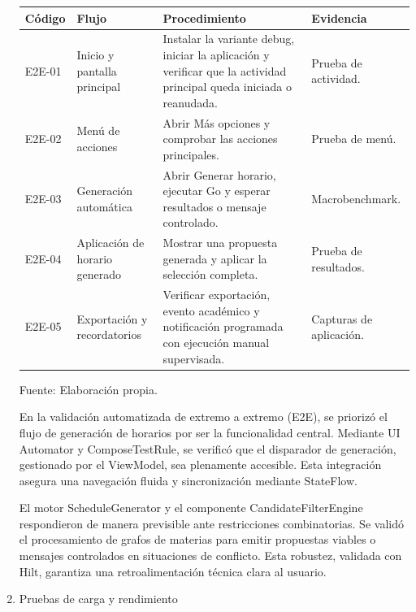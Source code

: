 \begin{enumerate}
\begin{center}
\begin{minipage}{\linewidth}
\centering
\begin{tabularx}{\linewidth}{@{}p{1.8cm}>{\RaggedRight\arraybackslash}X>{\RaggedRight\arraybackslash}X>{\RaggedRight\arraybackslash}p{3.4cm}@{}}
\toprule
Código & Flujo & Procedimiento & Evidencia \\
\midrule
E2E-01 & Inicio y pantalla principal & Instalar la variante debug, iniciar la aplicación y verificar que la actividad principal queda iniciada o reanudada. & Prueba de actividad. \\
E2E-02 & Menú de acciones & Abrir Más opciones y comprobar las acciones principales. & Prueba de menú. \\
E2E-03 & Generación automática & Abrir Generar horario, ejecutar Go y esperar resultados o mensaje controlado. & Macrobenchmark. \\
E2E-04 & Aplicación de horario generado & Mostrar una propuesta generada y aplicar la selección completa. & Prueba de resultados. \\
E2E-05 & Exportación y recordatorios & Verificar exportación, evento académico y notificación programada con ejecución manual supervisada. & Capturas de aplicación. \\
\bottomrule
\end{tabularx}
\label{tab:qa_e2e_resultados}
Fuente: Elaboración propia.
\end{minipage}
\end{center}

En la validación automatizada de extremo a extremo (E2E), se priorizó el flujo de generación de horarios por ser la funcionalidad central. Mediante UI Automator y ComposeTestRule, se verificó que el disparador de generación, gestionado por el ViewModel, sea plenamente accesible. Esta integración asegura una navegación fluida y sincronización mediante StateFlow.

El motor ScheduleGenerator y el componente CandidateFilterEngine respondieron de manera previsible ante restricciones combinatorias. Se validó el procesamiento de grafos de materias para emitir propuestas viables o mensajes controlados en situaciones de conflicto. Esta robustez, validada con Hilt, garantiza una retroalimentación técnica clara al usuario.

  \item Pruebas de carga y rendimiento


\end{enumerate}

